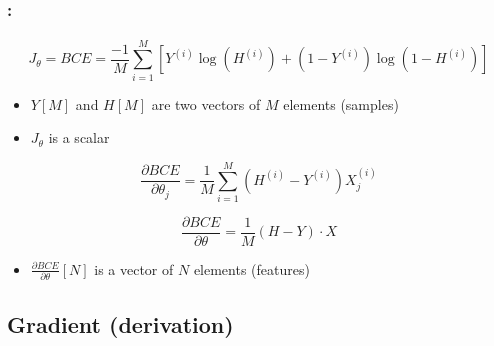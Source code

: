 \documentclass[xcolor=table]{beamer}
\begin{document}
\begin{frame}
	\frametitle{\insertshortsubtitle: \insertsection}
	\framesubtitle{\insertsubsection}

	\[J_\theta = BCE = \frac{-1}{M} \sum\limits_{i=1}^{M} [Y^{(i)} \log(H^{(i)}) + (1- Y^{(i)}) \log(1 - H^{(i)})]\]
	\begin{itemize}
		\item $Y[M]$ and $H[M]$ are two vectors of $M$ elements (samples)
		\item $J_\theta$ is a scalar
	\end{itemize}
	
	
	\[
	\frac{\partial BCE}{\partial \theta_j} = \frac{1}{M} \sum\limits_{i=1}^{M} (H^{(i)} - Y^{(i)}) X_j^{(i)}
	\]
	
	\[
	\frac{\partial BCE}{\partial \theta} = \frac{1}{M} (H - Y) \cdot X
	\]
	
	\begin{itemize}
		\item $\frac{\partial BCE}{\partial \theta}[N]$ is a vector of $N$ elements (features)
	\end{itemize}
	
\end{frame}

\subsection{Gradient (derivation)}
\end{document}

